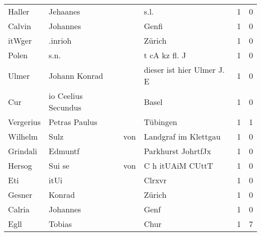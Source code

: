 \begin{tabular}{llllrr}
                   Haller &                           Jehaanes &             &                                        s.l. &          1 &         0 \\
                   Calvin &                           Johannes &             &                                       Genfi &          1 &         0 \\
                   itWger &                            .inrioh &             &                                      Zürich &          1 &         0 \\
                    Polen &                               s.n. &             &                               t cA kz fl. J &          1 &         0 \\
                    Ulmer &                      Johann Konrad &             &                  dieser ist hier Ulmer J. E &          1 &         0 \\
                      Cur &                io Ceelius Secundus &             &                                       Basel &          1 &         0 \\
                Vergerius &                      Petras Paulus &             &                                    Tübingen &          1 &         1 \\
                  Wilhelm &                               Sulz &         von &                        Landgraf im Klettgau &          1 &         0 \\
                 Grindali &                            Edmuntf &             &                          Parkhurst JohrtfJx &          1 &         0 \\
                   Hersog &                             Sui se &         von &                            C h itUAiM CUttT &          1 &         0 \\
                      Eti &                               itUi &             &                                      Clrxvr &          1 &         0 \\
                   Gesner &                             Konrad &             &                                      Zürich &          1 &         0 \\
                   Calria &                           Johannes &             &                                        Genf &          1 &         0 \\
                     Egll &                             Tobias &             &                                        Chur &          1 &         7 \\

\end{tabular}

